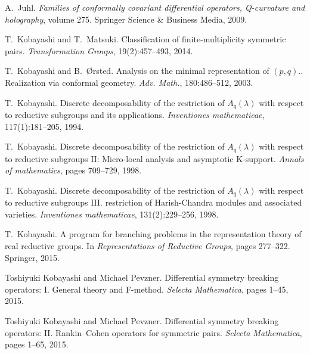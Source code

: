 \documentclass{article}
\newcommand{\tmtextit}[1]{{\itshape{#1}}}
\newcommand{\tmtextrm}[1]{{\rmfamily{#1}}}
\begin{document}
\begin{thebibliography}{CK{\O}P11}
  A.~Juhl. {\newblock}\tmtextit{Families of
  conformally covariant differential operators, Q-curvature and holography},
  volume 275. {\newblock}Springer Science \& Business Media, 2009.
  
  T.~Kobayashi and T.~Matsuki.
  {\newblock}Classification of finite-multiplicity symmetric pairs.
  {\newblock}\tmtextit{Transformation Groups}, 19(2):457--493, 2014.
  
  T.~Kobayashi and B.~{\O}rsted. {\newblock}Analysis on
  the minimal representation of \tmtextrm{O}$(p, q)$.\tmtextrm{I}. Realization
  via conformal geometry. {\newblock}\tmtextit{Adv. Math.}, 180:486--512,
  2003.
  
  T.~Kobayashi. {\newblock}Discrete
  decomposability of the restriction of $A_q (\lambda)$ with respect to
  reductive subgroups and its applications. {\newblock}\tmtextit{Inventiones
  mathematicae}, 117(1):181--205, 1994.
  
  T.~Kobayashi. {\newblock}Discrete
  decomposability of the restriction of $A_q (\lambda)$ with respect to
  reductive subgroups II: Micro-local analysis and asymptotic K-support.
  {\newblock}\tmtextit{Annals of mathematics}, pages 709--729, 1998.
  
  T.~Kobayashi. {\newblock}Discrete
  decomposability of the restriction of $A_q (\lambda)$ with respect to
  reductive subgroups III. restriction of Harish-Chandra modules and
  associated varieties. {\newblock}\tmtextit{Inventiones mathematicae},
  131(2):229--256, 1998.
  
  T.~Kobayashi. {\newblock}A program for
  branching problems in the representation theory of real reductive groups.
  {\newblock}In \tmtextit{Representations of Reductive Groups}, pages
  277--322. Springer, 2015.
  
  Toshiyuki Kobayashi and Michael
  Pevzner. {\newblock}Differential symmetry breaking operators: I. General
  theory and F-method. {\newblock}\tmtextit{Selecta Mathematica}, pages 1--45,
  2015.
  
  Toshiyuki Kobayashi and Michael
  Pevzner. {\newblock}Differential symmetry breaking operators: II.
  Rankin--Cohen operators for symmetric pairs. {\newblock}\tmtextit{Selecta
  Mathematica}, pages 1--65, 2015.
  

\end{thebibliography}
\end{document}
